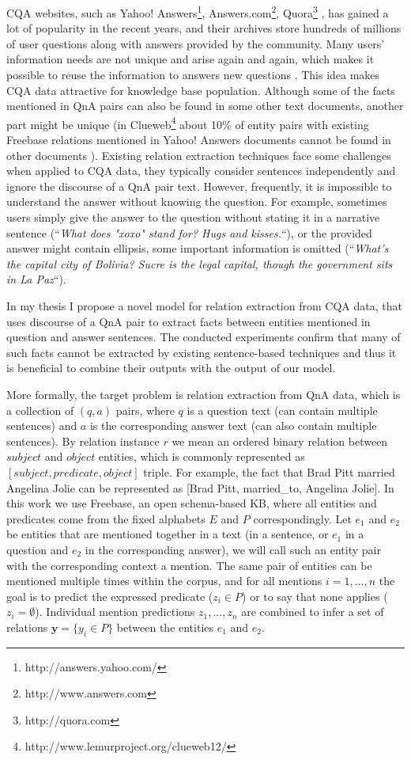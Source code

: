 CQA websites, such as Yahoo! Answers\footnote{http://answers.yahoo.com/}, Answers.com\footnote{http://www.answers.com}, Quora\footnote{http://quora.com} \etc, has gained a lot of popularity in the recent years, and their archives store hundreds of millions of user questions along with answers provided by the community.
Many users' information needs are not unique and arise again and again, which makes it possible to reuse the information to answers new questions \cite{Shtok:2012:LPA:2187836.2187939}.
This idea makes CQA data attractive for knowledge base population.
Although some of the facts mentioned in QnA pairs can also be found in some other text documents, another part might be unique (\eg in Clueweb\footnote{http://www.lemurproject.org/clueweb12/} about 10\% of entity pairs with existing Freebase relations mentioned in Yahoo! Answers documents cannot be found in other documents \cite{savenkov2015relation}).
Existing relation extraction techniques face some challenges when applied to CQA data, \ie they typically consider sentences independently and ignore the discourse of a QnA pair text.
However, frequently, it is impossible to understand the answer without knowing the question.
For example, sometimes users simply give the answer to the question without stating it in a narrative sentence (\eg ``\emph{What does "xoxo" stand for? Hugs and kisses.}``), or the provided answer might contain ellipsis, \ie some important information is omitted (\eg ``\emph{What's the capital city of Bolivia? Sucre is the legal capital, though the government sits in La Paz}``).

In my thesis I propose a novel model for relation extraction from CQA data, that uses discourse of a QnA pair to extract facts between entities mentioned in question and answer sentences.
The conducted experiments confirm that many of such facts cannot be extracted by existing sentence-based techniques and thus it is beneficial to combine their outputs with the output of our model.

More formally, the target problem is relation extraction from QnA data, which is a collection of $(q, a)$ pairs, where $q$ is a question text (can contain multiple sentences) and $a$ is the corresponding answer text (can also contain multiple sentences).
By relation instance $r$ we mean an ordered binary relation between $subject$ and $object$ entities, which is commonly represented as $[subject, predicate, object]$ triple.
For example, the fact that Brad Pitt married Angelina Jolie can be represented as [Brad Pitt, married\_to, Angelina Jolie].
In this work we use Freebase, an open schema-based KB, where all entities and predicates come from the fixed alphabets $E$ and $P$ correspondingly.
Let $e_1$ and $e_2$ be entities that are mentioned together in a text (\eg in a sentence, or $e_1$ in a question and $e_2$ in the corresponding answer), we will call such an entity pair with the corresponding context a mention.
The same pair of entities can be mentioned multiple times within the corpus, and for all mentions $i=1,...,n$ the goal is to predict the expressed predicate ($z_i \in P$) or to say that none applies ($z_i = \emptyset$).
Individual mention predictions $z_1, ..., z_n$ are combined to infer a set of relations $\mathbf{y}=\{y_i \in P\}$ between the entities $e_1$ and $e_2$.

